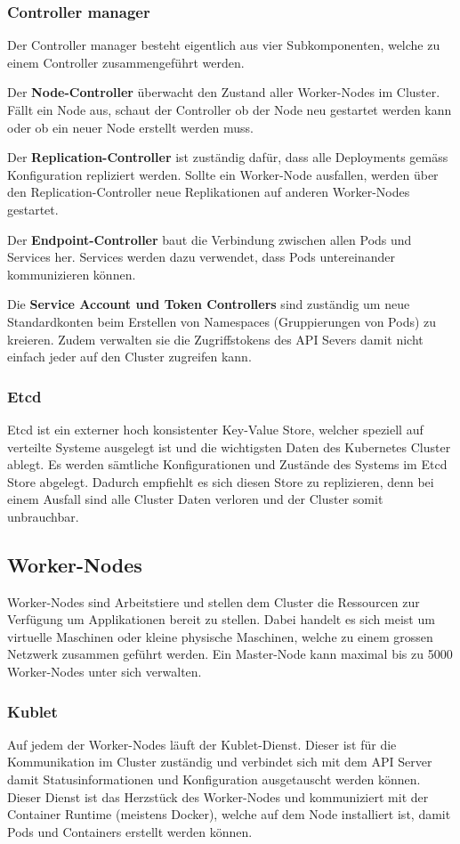 \subsubsection{Controller manager}
Der Controller manager besteht eigentlich aus vier Subkomponenten, welche zu einem Controller zusammengeführt werden. 

Der \textbf{Node-Controller} überwacht den Zustand aller Worker-Nodes im Cluster. Fällt ein Node aus, schaut der Controller ob der Node neu gestartet werden kann oder ob ein neuer Node erstellt werden muss.

Der \textbf{Replication-Controller} ist zuständig dafür, dass alle Deployments gemäss Konfiguration repliziert werden. Sollte ein Worker-Node ausfallen, werden über den Replication-Controller neue Replikationen auf anderen Worker-Nodes gestartet.

Der \textbf{Endpoint-Controller} baut die Verbindung zwischen allen Pods und Services her. Services werden dazu verwendet, dass Pods untereinander kommunizieren können.

Die \textbf{Service Account und Token Controllers} sind zuständig um neue Standardkonten beim Erstellen von Namespaces (Gruppierungen von Pods) zu kreieren. Zudem verwalten sie die Zugriffstokens des API Severs damit nicht einfach jeder auf den Cluster zugreifen kann. \cite{kubernetes}
\subsubsection{Etcd}
Etcd ist ein externer hoch konsistenter Key-Value Store, welcher speziell auf verteilte Systeme ausgelegt ist und die wichtigsten Daten des Kubernetes Cluster ablegt. Es werden sämtliche Konfigurationen und Zustände des Systems im Etcd Store abgelegt. Dadurch empfiehlt es sich diesen Store zu replizieren, denn bei einem Ausfall sind alle Cluster Daten verloren und der Cluster somit unbrauchbar. \cite{kubernetes}

\subsection{Worker-Nodes}
Worker-Nodes sind Arbeitstiere und stellen dem Cluster die Ressourcen zur Verfügung um Applikationen bereit zu stellen. Dabei handelt es sich meist um virtuelle Maschinen oder kleine physische Maschinen, welche zu einem grossen Netzwerk zusammen geführt werden. Ein Master-Node kann maximal bis zu 5000 Worker-Nodes unter sich verwalten. \cite{kubernetes}
\subsubsection{Kublet}
Auf jedem der Worker-Nodes läuft der Kublet-Dienst. Dieser ist für die Kommunikation im Cluster zuständig und verbindet sich mit dem API Server damit Statusinformationen und Konfiguration ausgetauscht werden können. Dieser Dienst ist das Herzstück des Worker-Nodes und kommuniziert mit der Container Runtime (meistens Docker), welche auf dem Node installiert ist, damit Pods und Containers erstellt werden können. \cite{kubernetes}
